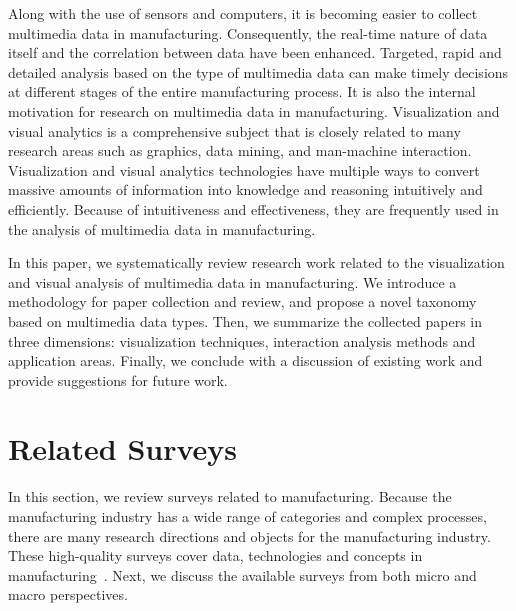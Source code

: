 \documentclass[a4paper,fleqn]{cas-dc}
\begin{document}
Along with the use of sensors and computers, it is becoming easier to collect multimedia data in manufacturing.
Consequently, the real-time nature of data itself and the correlation between data have been enhanced.
Targeted, rapid and detailed analysis based on the type of multimedia data can make timely decisions at different stages of the entire manufacturing process.
It is also the internal motivation for research on multimedia data in manufacturing.
Visualization and visual analytics is a comprehensive subject that is closely related to many research areas such as graphics, data mining, and man-machine interaction.
Visualization and visual analytics technologies have multiple ways to convert massive amounts of information into knowledge and reasoning intuitively and efficiently. Because of intuitiveness and effectiveness, they are frequently used in the analysis of multimedia data in manufacturing.

In this paper, we systematically review research work related to the visualization and visual analysis of multimedia data in manufacturing.
We introduce a methodology for paper collection and review, and propose a novel taxonomy based on multimedia data types.
Then, we summarize the collected papers in three dimensions: visualization techniques, interaction analysis methods and application areas.
Finally, we conclude with a discussion of existing work and provide suggestions for future work.



\section{Related Surveys}
In this section, we review surveys related to manufacturing.
Because the manufacturing industry has a wide range of categories and complex processes, there are many research directions and objects for the manufacturing industry.
These high-quality surveys cover data, technologies and concepts in manufacturing~\cite{Baboli2021,Chhikara2022,Cui2020,Park2020,Qu2019}.
Next, we discuss the available surveys from both micro and macro perspectives.
\end{document}
